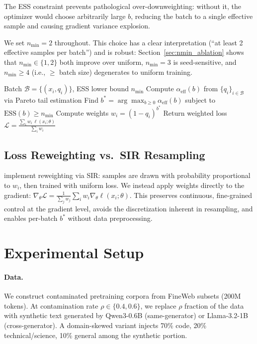 \documentclass[11pt]{article}
\begin{document}
The ESS constraint prevents pathological over-downweighting: without it, the optimizer would choose arbitrarily large $b$, reducing the batch to a single effective sample and causing gradient variance explosion.

We set $n_{\min} = 2$ throughout. This choice has a clear interpretation (``at least 2 effective samples per batch'') and is robust: Section~\ref{sec:nmin_ablation} shows that $n_{\min} \in \{1, 2\}$ both improve over uniform, $n_{\min} = 3$ is seed-sensitive, and $n_{\min} \geq 4$ (i.e., $\geq$ batch size) degenerates to uniform training.

\begin{algorithm}[t]
\caption{Adaptive $b^*$ Reweighting}
\label{alg:adaptive}
\begin{algorithmic}[1]
\REQUIRE Batch $\mathcal{B} = \{(x_i, q_i)\}$, ESS lower bound $n_{\min}$
\STATE Compute $\alpha_{\mathrm{eff}}(b)$ from $\{q_i\}_{i \in \mathcal{B}}$ via Pareto tail estimation
\STATE Find $b^* = \arg\max_{b \geq 0} \alpha_{\mathrm{eff}}(b)$ subject to $\mathrm{ESS}(b) \geq n_{\min}$
\STATE Compute weights $w_i = (1 - q_i)^{b^*}$
\STATE Return weighted loss $\mathcal{L} = \frac{\sum_i w_i \, \ell(x_i;\theta)}{\sum_i w_i}$
\end{algorithmic}
\end{algorithm}

\subsection{Loss Reweighting vs.\ SIR Resampling}

\citet{drayson2025contamination} implement reweighting via SIR: samples are drawn with probability proportional to $w_i$, then trained with uniform loss. We instead apply weights directly to the gradient:
$\nabla_\theta \mathcal{L} = \frac{1}{\sum_j w_j} \sum_i w_i \nabla_\theta \ell(x_i; \theta)$.
This preserves continuous, fine-grained control at the gradient level, avoids the discretization inherent in resampling, and enables per-batch $b^*$ without data preprocessing.

\section{Experimental Setup}
\label{sec:setup}

\paragraph{Data.}
We construct contaminated pretraining corpora from FineWeb subsets (200M tokens). At contamination rate $\rho \in \{0.4, 0.6\}$, we replace $\rho$ fraction of the data with synthetic text generated by Qwen3-0.6B (same-generator) or Llama-3.2-1B (cross-generator). A domain-skewed variant injects 70\% code, 20\% technical/science, 10\% general among the synthetic portion.
\end{document}
